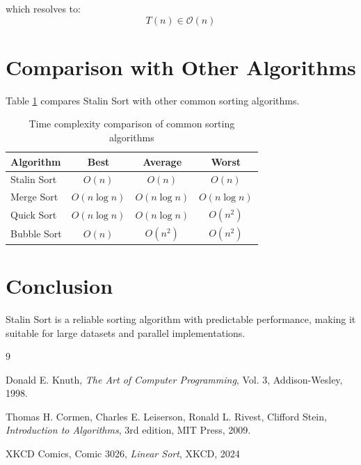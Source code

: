 \documentclass{article}
\begin{document}
which resolves to:
$$T(n) \in \mathcal{O}(n)$$

\section{Comparison with Other Algorithms}

Table \ref{table:sorting-comparison} compares Stalin Sort with other common sorting algorithms.

\begin{table}[h!]
\centering
\begin{tabular}{lccc}
\hline
Algorithm & Best & Average & Worst \\
\hline
Stalin Sort & $O(n)$ & $O(n)$ & $O(n)$ \\
Merge Sort & $O(n \log n)$ & $O(n \log n)$ & $O(n \log n)$ \\
Quick Sort & $O(n \log n)$ & $O(n \log n)$ & $O(n^2)$ \\
Bubble Sort & $O(n)$ & $O(n^2)$ & $O(n^2)$ \\
\hline
\end{tabular}
\caption{Time complexity comparison of common sorting algorithms}
\label{table:sorting-comparison}
\end{table}

\section{Conclusion}
 Stalin Sort is a reliable sorting algorithm with predictable performance,
 making it suitable for large datasets and parallel implementations.

\begin{thebibliography}{9}

Donald E. Knuth,
\textit{The Art of Computer Programming},
Vol. 3, Addison-Wesley, 1998.

Thomas H. Cormen, Charles E. Leiserson, Ronald L. Rivest, Clifford Stein,
\textit{Introduction to Algorithms}, 3rd edition,
MIT Press, 2009.

XKCD Comics, Comic 3026, \textit{Linear Sort}, XKCD, 2024

\end{thebibliography}
\end{document}
